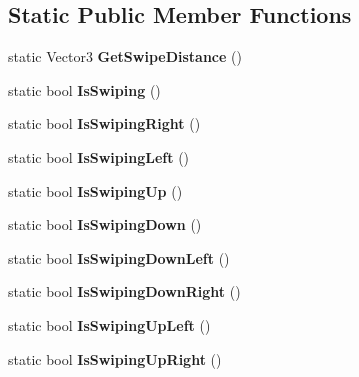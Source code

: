 \subsection*{Static Public Member Functions}
\begin{DoxyCompactItemize}
\item 
\mbox{\label{class_swipe_manager_a7a22694e414b3b71087d0d68b99f045b}} 
static Vector3 {\bfseries Get\+Swipe\+Distance} ()
\item 
\mbox{\label{class_swipe_manager_a124541a6618d86640ccd6df46405047a}} 
static bool {\bfseries Is\+Swiping} ()
\item 
\mbox{\label{class_swipe_manager_a8d55d81ba6e9bacaaefdb7849bc14801}} 
static bool {\bfseries Is\+Swiping\+Right} ()
\item 
\mbox{\label{class_swipe_manager_ac59cc2b722121f775f1ba475e5082912}} 
static bool {\bfseries Is\+Swiping\+Left} ()
\item 
\mbox{\label{class_swipe_manager_a2f633b1fc223073ead16a8eac2773322}} 
static bool {\bfseries Is\+Swiping\+Up} ()
\item 
\mbox{\label{class_swipe_manager_a66e6afb513de6211c68b34c7b1048705}} 
static bool {\bfseries Is\+Swiping\+Down} ()
\item 
\mbox{\label{class_swipe_manager_a292788978194a704164d954860195cff}} 
static bool {\bfseries Is\+Swiping\+Down\+Left} ()
\item 
\mbox{\label{class_swipe_manager_a2d3e5f154505de6c8ac442b6b18eada3}} 
static bool {\bfseries Is\+Swiping\+Down\+Right} ()
\item 
\mbox{\label{class_swipe_manager_a164e288f21fb799a5b35a844d5ab6589}} 
static bool {\bfseries Is\+Swiping\+Up\+Left} ()
\item 
\mbox{\label{class_swipe_manager_aac7a52f77ee8d303e19f798a4beb0113}} 
static bool {\bfseries Is\+Swiping\+Up\+Right} ()
\end{DoxyCompactItemize}
